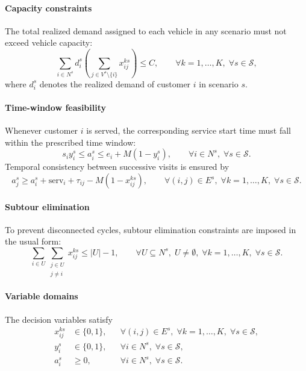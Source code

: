 \documentclass[pdflatex]{sn-jnl}
\begin{document}
\paragraph{Capacity constraints}
The total realized demand assigned to each vehicle in any scenario must not exceed vehicle capacity:
\begin{equation}
\label{eq:capacity_journal}
\sum_{i\in N^s} d_i^s
\left(
\sum_{j\in V^s\setminus\{i\}} x_{ij}^{ks}
\right)
\le C,
\qquad \forall k=1,\dots,K,\; \forall s\in\mathcal{S},
\end{equation}
where $d_i^s$ denotes the realized demand of customer $i$ in scenario $s$.

\paragraph{Time-window feasibility}
Whenever customer $i$ is served, the corresponding service start time must fall within the prescribed time window:
\begin{equation}
\label{eq:time_window_journal}
s_i y_i^s \le a_i^s \le e_i + M(1-y_i^s),
\qquad \forall i\in N^s,\; \forall s\in\mathcal{S}.
\end{equation}
Temporal consistency between successive visits is ensured by
\begin{equation}
\label{eq:time_link_journal}
a_j^s \ge a_i^s + \mathrm{serv}_i + \tau_{ij} - M(1-x_{ij}^{ks}),
\qquad \forall (i,j)\in E^s,\; \forall k=1,\dots,K,\; \forall s\in\mathcal{S}.
\end{equation}

\paragraph{Subtour elimination}
To prevent disconnected cycles, subtour elimination constraints are imposed in the usual form:
\begin{equation}
\label{eq:subtour_journal}
\sum_{i\in U}\sum_{\substack{j\in U\\j\neq i}} x_{ij}^{ks}
\le |U|-1,
\qquad \forall U\subseteq N^s,\; U\neq\emptyset,\; \forall k=1,\dots,K,\; \forall s\in\mathcal{S}.
\end{equation}

\paragraph{Variable domains}
The decision variables satisfy
\begin{align}
\label{eq:domain_x_journal}
x_{ij}^{ks} &\in \{0,1\},
&& \forall (i,j)\in E^s,\; \forall k=1,\dots,K,\; \forall s\in\mathcal{S},\\
\label{eq:domain_y_journal}
y_i^s &\in \{0,1\},
&& \forall i\in N^s,\; \forall s\in\mathcal{S},\\
\label{eq:domain_a_journal}
a_i^s &\ge 0,
&& \forall i\in N^s,\; \forall s\in\mathcal{S}.
\end{align}
\end{document}
